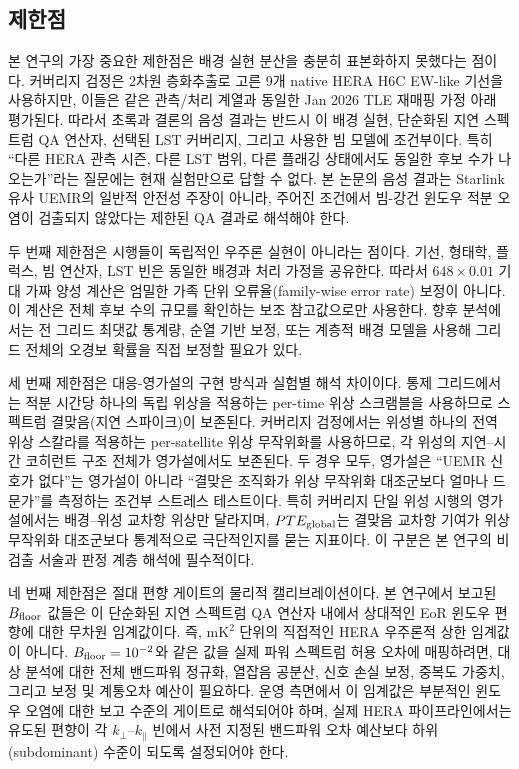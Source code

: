 \documentclass[final,5p,times]{elsarticle}
\begin{document}
\subsection{제한점}
\label{sec:discussion:limitations}

본 연구의 가장 중요한 제한점은 배경 실현 분산을 충분히 표본화하지 못했다는 점이다. 커버리지 검정은
2차원 층화추출로 고른 9개 native HERA H6C EW-like 기선을 사용하지만, 이들은 같은 관측/처리 계열과
동일한 Jan 2026 TLE 재매핑 가정 아래 평가된다. 따라서 초록과 결론의 음성 결과는 반드시 이 배경 실현,
단순화된 지연 스펙트럼 QA 연산자, 선택된 LST 커버리지, 그리고 사용한 빔 모델에 조건부이다. 특히 ``다른 HERA 관측 시즌, 다른 LST 범위, 다른 플래깅
상태에서도 동일한 후보 수가 나오는가''라는 질문에는 현재 실험만으로 답할 수 없다. 본 논문의 음성 결과는 Starlink 유사 UEMR의
일반적 안전성 주장이 아니라, 주어진 조건에서 빔-강건 윈도우 적분 오염이 검출되지 않았다는 제한된 QA 결과로 해석해야 한다.

두 번째 제한점은 시행들이 독립적인 우주론 실현이 아니라는 점이다. 기선, 형태학, 플럭스, 빔 연산자, LST 빈은
동일한 배경과 처리 가정을 공유한다. 따라서 $648\times0.01$ 기대 가짜 양성 계산은 엄밀한 가족 단위
오류율(family-wise error rate) 보정이 아니다. 이 계산은 전체 후보 수의 규모를 확인하는 보조 참고값으로만 사용한다.
향후 분석에서는 전 그리드 최댓값 통계량, 순열 기반 보정, 또는 계층적 배경 모델을 사용해 그리드 전체의
오경보 확률을 직접 보정할 필요가 있다.

세 번째 제한점은 대응-영가설의 구현 방식과 실험별 해석 차이이다. 통제 그리드에서는 적분 시간당 하나의 독립 위상을
적용하는 per-time 위상 스크램블을 사용하므로 스펙트럼 결맞음(지연 스파이크)이 보존된다. 커버리지 검정에서는
위성별 하나의 전역 위상 스칼라를 적용하는 per-satellite 위상 무작위화를 사용하므로, 각 위성의 지연--시간
코히런트 구조 전체가 영가설에서도 보존된다. 두 경우 모두, 영가설은 ``UEMR 신호가 없다''는 영가설이 아니라
``결맞은 조직화가 위상 무작위화 대조군보다 얼마나 드문가''를 측정하는 조건부 스트레스 테스트이다. 특히 커버리지
단일 위성 시행의 영가설에서는 배경--위성 교차항 위상만 달라지며, $PTE_{\rm global}$는 결맞음 교차항 기여가
위상 무작위화 대조군보다 통계적으로 극단적인지를 묻는 지표이다.
이 구분은 본 연구의 비검출 서술과 판정 계층 해석에 필수적이다.

네 번째 제한점은 절대 편향 게이트의 물리적 캘리브레이션이다. 본 연구에서 보고된 $B_{\rm floor}$ 값들은 이 단순화된 지연 스펙트럼 QA 연산자 내에서 상대적인 EoR 윈도우 편향에 대한 무차원 임계값이다. 즉, $\mathrm{mK}^2$ 단위의 직접적인 HERA 우주론적 상한 임계값이 아니다. $B_{\rm floor}=10^{-2}$와 같은 값을 실제 파워 스펙트럼 허용 오차에 매핑하려면, 대상 분석에 대한 전체 밴드파워 정규화, 열잡음 공분산, 신호 손실 보정, 중복도 가중치, 그리고 보정 및 계통오차 예산이 필요하다. 운영 측면에서 이 임계값은 부분적인 윈도우 오염에 대한 보고 수준의 게이트로 해석되어야 하며, 실제 HERA 파이프라인에서는 유도된 편향이 각 $k_\perp$--$k_\parallel$ 빈에서 사전 지정된 밴드파워 오차 예산보다 하위(subdominant) 수준이 되도록 설정되어야 한다.
\end{document}
